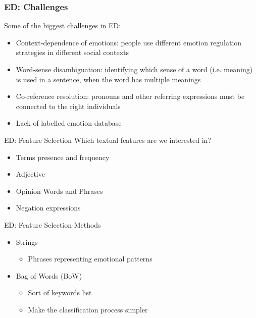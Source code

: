 \documentclass[xcolor=dvipsnames]{beamer}
\begin{document}
\begin{frame}
\frametitle{ED: Challenges}
Some of the biggest challenges in ED:
\begin{itemize}
\item Context-dependence of emotions: people use different emotion regulation strategies in different social contexts
\item Word-sense disambiguation: identifying which sense of a word (i.e. meaning) is used in a sentence, when the word has multiple meanings
\item Co-reference resolution: pronouns and other referring expressions must be connected to the right individuals
\item Lack of labelled emotion database
\end{itemize}
\end{frame}

\begin{frame}{ED: Feature Selection}
Which textual features are we interested in?
\begin{itemize}
\item Terms presence and frequency
\item Adjective
\item Opinion Words and Phrases
\item Negation expressions
\end{itemize}
\end{frame}

\begin{frame}{ED: Feature Selection Methods}
\begin{itemize}
\item Strings
\begin{itemize}
\item Phrases representing emotional patterns
\end{itemize}
\item Bag of Words (BoW)
\begin{itemize}
\item Sort of keywords list
\item Make the classification process simpler
\end{itemize}
\end{itemize}
\end{frame}
\end{document}
